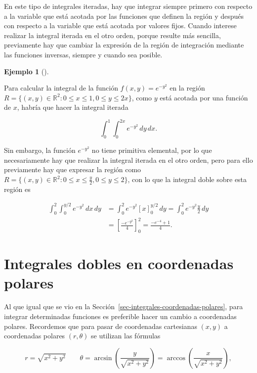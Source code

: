 \documentclass[
  a4paper,
]{scrreport}
\theoremstyle{plain}
\theoremstyle{definition}
\theoremstyle{plain}
\theoremstyle{plain}
\theoremstyle{definition}
\newtheorem{example}{Ejemplo}[chapter]
\theoremstyle{definition}
\theoremstyle{remark}
\begin{document}
En este tipo de integrales iteradas, hay que integrar siempre primero
con respecto a la variable que está acotada por las funciones que
definen la región y después con respecto a la variable que está acotada
por valores fijos. Cuando interese realizar la integral iterada en el
otro orden, porque resulte más sencilla, previamente hay que cambiar la
expresión de la región de integración mediante las funciones inversas,
siempre y cuando sea posible.

\begin{example}[]\protect\hypertarget{exm-integral-region-irregular-2}{}\label{exm-integral-region-irregular-2}

Para calcular la integral de la función \(f(x,y)=e^{-y^2}\) en la región
\(R=\{(x,y)\in \mathbb{R}^2: 0\leq x\leq 1, 0\leq y\leq 2x\}\), como
\(y\) está acotada por una función de \(x\), habría que hacer la
integral iterada

\[
\int_0^1\int_0^{2x} e^{-y^2}\,dy\,dx.
\]

Sin embargo, la función \(e^{-y^2}\) no tiene primitiva elemental, por
lo que necesariamente hay que realizar la integral iterada en el otro
orden, pero para ello previamente hay que expresar la región como
\(R=\{(x,y)\in \mathbb{R}^2: 0\leq x\leq \frac{y}{2}, 0\leq y\leq 2\}\),
con lo que la integral doble sobre esta región es

\begin{align*}
\int_0^2\int_0^{y/2} e^{-y^2}\,dx\,dy 
&= \int_0^2 e^{-y^2}[x]_0^{y/2}\,dy 
= \int_0^2 e^{-y^2}\frac{y}{2}\,dy \\
&= \left[\frac{-e^{-y^2}}{4}\right]_0^2
= \frac{-e^{-4}+1}{4}.
\end{align*}

\end{example}

\section{Integrales dobles en coordenadas
polares}\label{integrales-dobles-en-coordenadas-polares}

Al que igual que se vio en la
Sección~\ref{sec-integrales-coordenadas-polares}, para integrar
determinadas funciones es preferible hacer un cambio a coordenadas
polares. Recordemos que para pasar de coordenadas cartesianas \((x,y)\)
a coordenadas polares \((r,\theta)\) se utilizan las fórmulas

\[
r = \sqrt{x^2 + y^2} \qquad \theta = \operatorname{arcsin}\left(\frac{y}{\sqrt{x^2+y^2}}\right) = \operatorname{arccos}\left(\frac{x}{\sqrt{x^2+y^2}}\right),
\]
\end{document}
